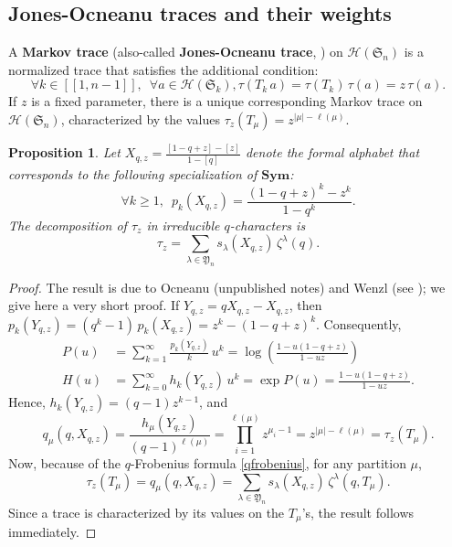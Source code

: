 \documentclass[smallextended,nospthms]{svjour3}
\newtheorem{proposition}[theorem]{Proposition}
\theoremstyle{remark}
\newcommand{\hecke}{\mathscr{H}}
\newcommand{\sym}{\mathfrak{S}}
\newcommand{\Sym}{\mathbf{Sym}}
\newcommand{\ym}{\mathfrak{Y}}
\newcommand{\lle}{\left[\!\left[}
\newcommand{\rre}{\right]\!\right]}
\begin{document}
\subsection{Jones-Ocneanu traces and their weights}\label{jonesocneanu}
A \textbf{Markov trace} (also-called \textbf{Jones-Ocneanu trace}, \cite{Jon87}) on $\hecke(\sym_{n})$ is a normalized trace that satisfies the additional condition:
$$
\forall k \in \lle 1,n-1\rre,\,\,\,\forall a \in \hecke(\sym_{k}), \tau(T_{k}\,a)=\tau(T_{k})\,\tau(a)=z\,\tau(a).
$$
If $z$ is a fixed parameter, there is a unique corresponding Markov trace on $\hecke(\sym_{n})$, characterized by the values $\tau_{z}(T_{\mu})=z^{|\mu|-\ell(\mu)}$.
\begin{proposition}
Let $X_{q,z}=\frac{[1-q+z]-[z]}{1-[q]}$ denote the formal alphabet that corresponds to the following specialization of $\Sym$: 
$$
\forall k \geq 1,\,\,\,p_{k}(X_{q,z})=\frac{(1-q+z)^{k}-z^{k}}{1-q^{k}}.
$$
The decomposition of $\tau_{z}$ in irreducible $q$-characters is
$$
\tau_{z}=\sum_{\lambda \in \ym_{n}}s_{\lambda}(X_{q,z})\,\zeta^{\lambda}(q).
$$
\end{proposition}
\begin{proof}
The result is due to Ocneanu (unpublished notes) and Wenzl (see \cite{Wen88}); we give here a very short proof. If $Y_{q,z}=qX_{q,z}-X_{q,z}$, then $p_{k}(Y_{q,z})=(q^{k}-1)\,p_{k}(X_{q,z})=z^{k}-(1-q+z)^{k}$. Consequently,
\begin{align*}
P(u)&=\sum_{k=1}^{\infty} \frac{p_{k}(Y_{q,z})}{k}\,u^{k}=\log\left( \frac{1-u(1-q+z)}{1-uz}\right)\\
H(u)&=\sum_{k=0}^{\infty}h_{k}(Y_{q,z})\,u^{k}=\exp P(u)=\frac{1-u(1-q+z)}{1-uz}.
\end{align*}
Hence, $h_{k}(Y_{q,z})=(q-1)z^{k-1}$, and $$q_{\mu}(q,X_{q,z})=\frac{h_{\mu}(Y_{q,z})}{(q-1)^{\ell(\mu)}}=\prod_{i=1}^{\ell(\mu)} z^{\mu_{i}-1} =z^{|\mu|-\ell(\mu)}=\tau_{z}(T_{\mu}).$$
Now, because of the $q$-Frobenius formula \ref{qfrobenius}, for any partition $\mu$,
$$
\tau_{z}(T_{\mu})=q_{\mu}(q,X_{q,z})=\sum_{\lambda \in \ym_{n}} s_{\lambda}(X_{q,z})\,\zeta^{\lambda}(q,T_{\mu}).
$$
Since a trace is characterized by its values on the $T_{\mu}$'s, the result follows immediately.
\end{proof}
\bigskip
\bigskip
\end{document}
